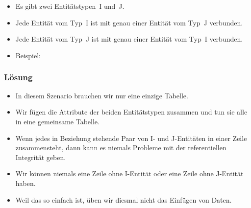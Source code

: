 %
\section{}%
%
\begin{frame}[t]%
\frametitle{}%
\begin{itemize}%
\item Es gibt zwei Entitätstypen~I und~J.%
\item<2-> Jede Entität vom Typ~I ist mit genau einer Entität vom Typ~J verbunden.
\item<3-> Jede Entität vom Typ~J ist mit genau einer Entität vom Typ~I verbunden.
\item<4-> Beispiel:%
\end{itemize}%
%
%
\end{frame}%
%
\begin{frame}[t]%
\frametitle{Lösung}%
\parbox{0.435\linewidth}{\small%
\begin{itemize}%
%
\item In diesem Szenario brauchen wir nur eine einzige Tabelle\cite{S2024D:MEDTRDM}.%
%
\item<2-> Wir fügen die Attribute der beiden Entitätstypen zusammen und tun sie alle in eine gemeinsame Tabelle.%
%
\item<3-> Wenn jedes in Beziehung stehende Paar von I- und J-Entitäten in einer Zeile zusammensteht, dann kann es niemals Probleme mit der referentiellen Integrität geben.%
%
\item<4-> Wir können niemals eine Zeile ohne I-Entität oder eine Zeile ohne J-Entität haben.%
%
\item<5-> Weil das so einfach ist, üben wir diesmal nicht das Einfügen von Daten.%
%
\end{itemize}%
}%
%
\end{frame}%
%
